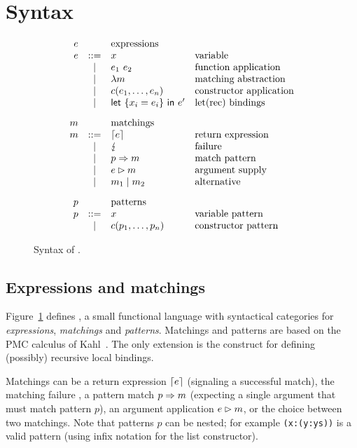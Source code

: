 \section{Syntax}\label{sec:syntax}

\begin{figure}
  \[
    \begin{array}{rcll}
      e & &     \text{expressions} \\
      e & ::= &  x  & \text{variable} \\
      & | &  e_1~e_2 & \text{function application} \\
      & | & \lambda m & \text{matching abstraction} \\
      & | &  c(e_1,\ldots,e_n) & \text{constructor application} \\
      & | & \textsf{let}~\{x_i=e_i\}~\textsf{in}~e' & \text{let(rec) bindings} \\[2ex]
      m &  & \text{matchings} \\
      m & ::= & \left\lceil e\right\rceil & \text{return expression}\\
      & | & \lightning & \text{failure} \\
      & | & p \Rightarrow m & \text{match pattern} \\
      & | & e\rhd m & \text{argument supply}\\
      & | & m_1 \mid m_2 & \text{alternative}\\[2ex]
      p & & \text{patterns}\\
      p & ::= & x & \text{variable pattern} \\
      & | & c(p_1,\ldots,p_n) & \text{constructor pattern} 
  \end{array}
\]
\caption{Syntax of \lambdaPMC.}\label{fig:syntax}
\end{figure}

\subsection{Expressions and matchings}
Figure~\ref{fig:syntax} defines \lambdaPMC, a small functional
language with syntactical categories for \emph{expressions},
\emph{matchings} and \emph{patterns}. Matchings and patterns are
based on the PMC calculus of Kahl~\cite{kahl_2004}.
The only extension is the \llet{\ldots}{\ldots} construct
for defining (possibly) recursive local bindings.

Matchings can be a return expression $\left\lceil e\right\rceil$ (signaling a
successful match), the matching failure \matchfail,
a pattern match $p \Rightarrow m$ (expecting a
single argument that must match pattern $p$), an argument application
$e\rhd m$, or the choice  between two
matchings.  Note that patterns $p$ can be nested; for example
\verb|(x:(y:ys))| is a valid pattern (using infix notation for the
list constructor).

